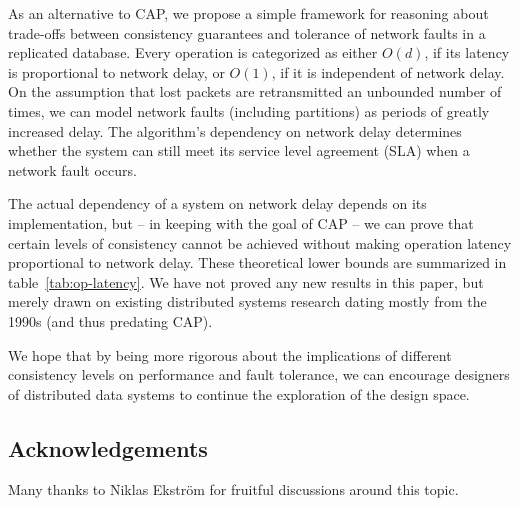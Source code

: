 \documentclass[a4paper,twocolumn,10pt]{article}
\begin{document}
As an alternative to CAP, we propose a simple framework for reasoning about trade-offs between
consistency guarantees and tolerance of network faults in a replicated database. Every operation is
categorized as either $O(d)$, if its latency is proportional to network delay, or $O(1)$, if it is
independent of network delay. On the assumption that lost packets are retransmitted an unbounded
number of times, we can model network faults (including partitions) as periods of greatly increased
delay. The algorithm's dependency on network delay determines whether the system can still meet its
service level agreement (SLA) when a network fault occurs.

The actual dependency of a system on network delay depends on its implementation, but -- in keeping
with the goal of CAP -- we can prove that certain levels of consistency cannot be achieved without
making operation latency proportional to network delay. These theoretical lower bounds are
summarized in table~\ref{tab:op-latency}. We have not proved any new results in this paper, but
merely drawn on existing distributed systems research dating mostly from the 1990s (and thus
predating CAP).

We hope that by being more rigorous about the implications of different consistency levels on
performance and fault tolerance, we can encourage designers of distributed data systems to continue
the exploration of the design space.

\subsection*{Acknowledgements}

Many thanks to Niklas Ekström for fruitful discussions around this topic.

{\footnotesize

{}}
\end{document}
